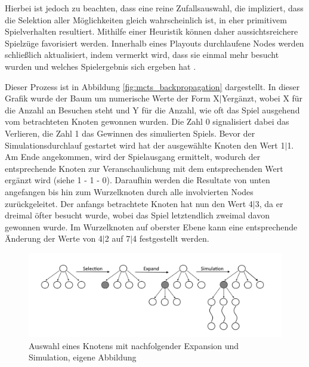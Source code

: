 \documentclass[12pt,a4paper]{article}
\begin{document}
Hierbei ist jedoch zu beachten, dass eine reine Zufallsauswahl, die impliziert, dass die Selektion aller Möglichkeiten gleich wahrscheinlich ist, in eher primitivem Spielverhalten resultiert. Mithilfe einer Heuristik können daher aussichtsreichere Spielzüge favorisiert werden. Innerhalb eines Playouts durchlaufene Nodes werden schließlich aktualisiert, indem vermerkt wird, dass sie einmal mehr besucht wurden und welches Spielergebnis sich ergeben hat \cite{Chaslot2008}.

Dieser Prozess ist in Abbildung \ref{fig:mcts_backpropagation} dargestellt. In dieser Grafik wurde der Baum um numerische Werte der Form \glqq{}X$|$Y\grqq  ergänzt, wobei X für die Anzahl an Besuchen steht und Y für die Anzahl, wie oft das Spiel ausgehend vom betrachteten Knoten gewonnen wurden. Die Zahl \glqq{}0\grqq{} signalisiert dabei das Verlieren, die Zahl \glqq{}1\grqq{} das Gewinnen des simulierten Spiels. Bevor der Simulationsdurchlauf gestartet wird hat der ausgewählte Knoten den Wert \glqq{}1$|$1\grqq{}. Am Ende angekommen, wird der Spielausgang ermittelt, wodurch der entsprechende Knoten zur Veranschaulichung mit dem entsprechenden Wert ergänzt wird (siehe \glqq{}1\grqq{} - \glqq{}1\grqq{} - \glqq{}0\grqq). Daraufhin werden die Resultate von unten angefangen bis hin zum Wurzelknoten durch alle involvierten Nodes zurückgeleitet. Der anfangs betrachtete Knoten hat nun den Wert \glqq{}4$|$3\grqq{}, da er dreimal öfter besucht wurde, wobei das Spiel letztendlich zweimal davon gewonnen wurde. Im Wurzelknoten auf oberster Ebene kann eine entsprechende Änderung der Werte von \glqq{}4$|$2\grqq{} auf \glqq{}7$|$4\grqq{} festgestellt werden.

\begin{figure}
\centering
\includegraphics[width=1.0\textwidth]{pics/SelectionExpandSimulation.png}	
\caption{Auswahl eines Knotens mit nachfolgender Expansion und Simulation, eigene Abbildung}
	\label{fig:mcts_exp_sim}
\end{figure}
\end{document}
